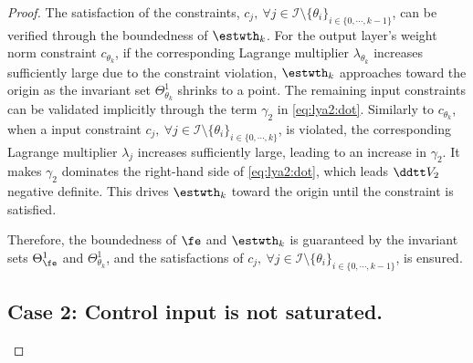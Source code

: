 \documentclass[letterpaper, journal]{IEEEtran}
\begin{document}
\begin{proof}
The satisfaction of the constraints, \ie $c_j,\ \forall j\in\mathcal{I}\setminus \{\theta_i\}_{i\in\{0,\cdots,k-1\}}$, can be verified through the boundedness of $\estwth_k$.
For the output layer's weight norm constraint $c_{\theta_k}$, if the corresponding Lagrange multiplier $\lambda_{\theta_k}$ increases sufficiently large due to the constraint violation, $\estwth_k$ approaches toward the origin as the invariant set $\Theta_{\theta_k}^{1}$ shrinks to a point.
The remaining input constraints can be validated implicitly through the term ${\gamma}_2$ in \eqref{eq:lya2:dot}.
Similarly to $c_{\theta_k}$, when a input constraint $c_j,\ \forall j\in\mathcal{I}\setminus \{\theta_i\}_{i\in\{0,\cdots,k\}}$, is violated, the corresponding Lagrange multiplier $\lambda_j$ increases sufficiently large, leading to an increase in ${\gamma}_2$.
It makes ${\gamma}_2$ dominates the right-hand side of \eqref{eq:lya2:dot}, which leads $\ddtt V_2$ negative definite.
This drives $\estwth_k$ toward the origin until the constraint is satisfied.

Therefore, the boundedness of $\fe$ and $\estwth_k$ is guaranteed by the invariant sets $\Theta_{\fe}^{1}$ and $\Theta_{\theta_k}^{1}$, and the satisfactions of $c_j,\ \forall j\in\mathcal{I}\setminus \{\theta_i\}_{i\in\{0,\cdots,k-1\}}$, is ensured.

\subsection*{Case 2: Control input is not saturated.}


\end{proof}
\end{document}
